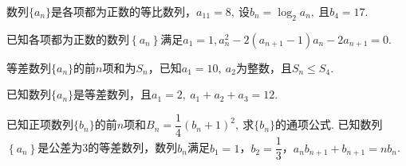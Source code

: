 \documentclass{BHCexam}
\begin{document}
\begin{questions}
\kongbai
\qs 数列$\{a_n\}$是各项都为正数的等比数列，$ a_{11}=8 ,~$设$ b_n=\log_2a_n,~ $且$ b_4 =17.$
\kongbai 
\question
已知各项都为正数的数列$\left\{a_n\right\}$满足$a_1=1,a_n^2-2(a_{n+1}-1)a_n-2a_{n+1}=0$.
\newpage
\qs 等差数列$\{a_n\}$的前$n$项和为$S_n$，已知$a_1=10,~$$a_2$为整数，且$S_n\le S_4.$
\kongbai
\qs 已知数列$\{a_n\}$是等差数列，且$a_1=2,~a_1+a_2+a_3=12.$
\newpage
\qs 已知正项数列$ \{b_n\} $的前$n$项和$ B_n=\dfrac{1}{4}(b_n+1)^2,~$求$\{b_n\}$的通项公式.
\kongbai
\question
已知数列$\left\{a_n\right\}$是公差为3的等差数列，数列${b_n}$满足$b_1=1$，$b_2=\dfrac{1}{3}$，$a_nb_{n+1}+b_{n+1}=nb_n$.
\begin{parts}

\end{parts}
\end{questions}
\end{document}

